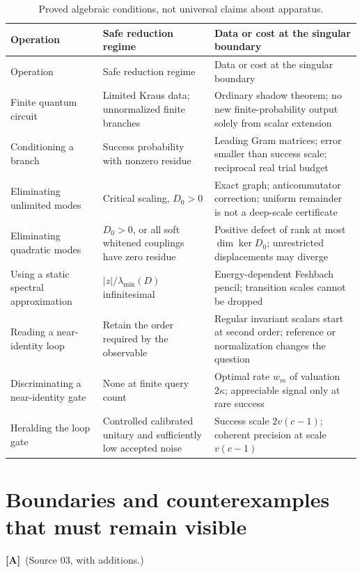 \documentclass[11pt,oneside]{article}
\numberwithin{equation}{section}
\theoremstyle{plain}
\theoremstyle{definition}
\theoremstyle{remark}
\newcommand{\abs}[1]{\left|#1\right|}
\newcommand{\TA}{\textcolor{TierA}{\textsf{\bfseries[A]}}}
\begin{document}
\begin{longtable}{@{}L{0.22\textwidth}L{0.33\textwidth}L{0.37\textwidth}@{}}
\caption{Proved algebraic conditions, not universal claims about apparatus.}\label{qgs:ops:tab:decision}\\
\toprule
Operation & Safe reduction regime & Data or cost at the singular boundary\\
\midrule
\endfirsthead
\toprule
Operation & Safe reduction regime & Data or cost at the singular boundary\\
\midrule
\endhead
\bottomrule
\endfoot
Finite quantum circuit
 & Limited Kraus data; unnormalized finite branches
 & Ordinary shadow theorem; no new finite-probability output solely from scalar extension\\[3pt]
Conditioning a branch
 & Success probability with nonzero residue
 & Leading Gram matrices; error smaller than success scale; reciprocal real trial budget\\[3pt]
Eliminating unlimited modes
 & Critical scaling, $D_0>0$
 & Exact graph; anticommutator correction; uniform remainder is not a deep-scale certificate\\[3pt]
Eliminating quadratic modes
 & $D_0>0$, or all soft whitened couplings have zero residue
 & Positive defect of rank at most $\dim\ker D_0$; unrestricted displacements may diverge\\[3pt]
Using a static spectral approximation
 & $\abs z/\lambda_{\min}(D)$ infinitesimal
 & Energy-dependent Feshbach pencil; transition scales cannot be dropped\\[3pt]
Reading a near-identity loop
 & Retain the order required by the observable
 & Regular invariant scalars start at second order; reference or normalization changes the question\\[3pt]
Discriminating a near-identity gate
 & None at finite query count
 & Optimal rate $w_m$ of valuation $2\kappa$; appreciable signal only at rare success\\[3pt]
Heralding the loop gate
 & Controlled calibrated unitary and sufficiently low accepted noise
 & Success scale $2v(c-1)$; coherent precision at scale $v(c-1)$\\
\end{longtable}

\section{Boundaries and counterexamples that must remain visible}\label{qgs:sec:boundaries}
\TA\ (Source 03, with additions.)
\end{document}

